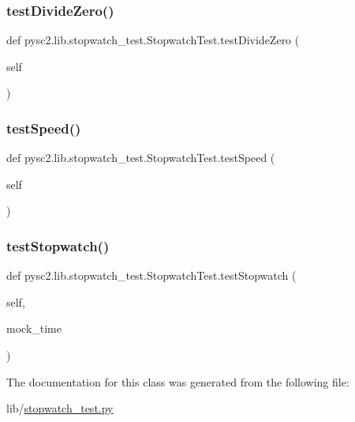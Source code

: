 \subsubsection{\texorpdfstring{test\+Divide\+Zero()}{testDivideZero()}}
{\footnotesize\ttfamily def pysc2.\+lib.\+stopwatch\+\_\+test.\+Stopwatch\+Test.\+test\+Divide\+Zero (\begin{DoxyParamCaption}\item[{}]{self }\end{DoxyParamCaption})}

\mbox{\label{classpysc2_1_1lib_1_1stopwatch__test_1_1_stopwatch_test_a33e9450263a55fc60359d7b6407d450e}} 
\subsubsection{\texorpdfstring{test\+Speed()}{testSpeed()}}
{\footnotesize\ttfamily def pysc2.\+lib.\+stopwatch\+\_\+test.\+Stopwatch\+Test.\+test\+Speed (\begin{DoxyParamCaption}\item[{}]{self }\end{DoxyParamCaption})}

\mbox{\label{classpysc2_1_1lib_1_1stopwatch__test_1_1_stopwatch_test_a6a127bb92911432cfc6b2566453c3d71}} 
\subsubsection{\texorpdfstring{test\+Stopwatch()}{testStopwatch()}}
{\footnotesize\ttfamily def pysc2.\+lib.\+stopwatch\+\_\+test.\+Stopwatch\+Test.\+test\+Stopwatch (\begin{DoxyParamCaption}\item[{}]{self,  }\item[{}]{mock\+\_\+time }\end{DoxyParamCaption})}



The documentation for this class was generated from the following file\+:\begin{DoxyCompactItemize}
\item 
lib/\mbox{\hyperlink{stopwatch__test_8py}{stopwatch\+\_\+test.\+py}}\end{DoxyCompactItemize}
